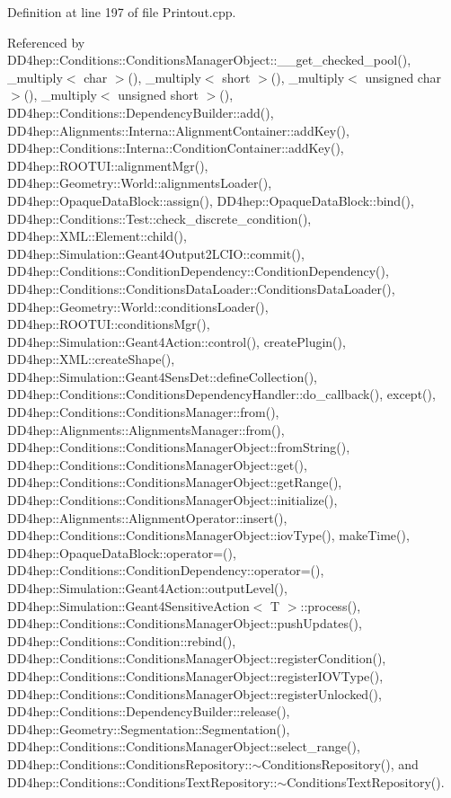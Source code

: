 Definition at line 197 of file Printout.\+cpp.



Referenced by D\+D4hep\+::\+Conditions\+::\+Conditions\+Manager\+Object\+::\+\_\+\+\_\+get\+\_\+checked\+\_\+pool(), \+\_\+multiply$<$ char $>$(), \+\_\+multiply$<$ short $>$(), \+\_\+multiply$<$ unsigned char $>$(), \+\_\+multiply$<$ unsigned short $>$(), D\+D4hep\+::\+Conditions\+::\+Dependency\+Builder\+::add(), D\+D4hep\+::\+Alignments\+::\+Interna\+::\+Alignment\+Container\+::add\+Key(), D\+D4hep\+::\+Conditions\+::\+Interna\+::\+Condition\+Container\+::add\+Key(), D\+D4hep\+::\+R\+O\+O\+T\+U\+I\+::alignment\+Mgr(), D\+D4hep\+::\+Geometry\+::\+World\+::alignments\+Loader(), D\+D4hep\+::\+Opaque\+Data\+Block\+::assign(), D\+D4hep\+::\+Opaque\+Data\+Block\+::bind(), D\+D4hep\+::\+Conditions\+::\+Test\+::check\+\_\+discrete\+\_\+condition(), D\+D4hep\+::\+X\+M\+L\+::\+Element\+::child(), D\+D4hep\+::\+Simulation\+::\+Geant4\+Output2\+L\+C\+I\+O\+::commit(), D\+D4hep\+::\+Conditions\+::\+Condition\+Dependency\+::\+Condition\+Dependency(), D\+D4hep\+::\+Conditions\+::\+Conditions\+Data\+Loader\+::\+Conditions\+Data\+Loader(), D\+D4hep\+::\+Geometry\+::\+World\+::conditions\+Loader(), D\+D4hep\+::\+R\+O\+O\+T\+U\+I\+::conditions\+Mgr(), D\+D4hep\+::\+Simulation\+::\+Geant4\+Action\+::control(), create\+Plugin(), D\+D4hep\+::\+X\+M\+L\+::create\+Shape(), D\+D4hep\+::\+Simulation\+::\+Geant4\+Sens\+Det\+::define\+Collection(), D\+D4hep\+::\+Conditions\+::\+Conditions\+Dependency\+Handler\+::do\+\_\+callback(), except(), D\+D4hep\+::\+Conditions\+::\+Conditions\+Manager\+::from(), D\+D4hep\+::\+Alignments\+::\+Alignments\+Manager\+::from(), D\+D4hep\+::\+Conditions\+::\+Conditions\+Manager\+Object\+::from\+String(), D\+D4hep\+::\+Conditions\+::\+Conditions\+Manager\+Object\+::get(), D\+D4hep\+::\+Conditions\+::\+Conditions\+Manager\+Object\+::get\+Range(), D\+D4hep\+::\+Conditions\+::\+Conditions\+Manager\+Object\+::initialize(), D\+D4hep\+::\+Alignments\+::\+Alignment\+Operator\+::insert(), D\+D4hep\+::\+Conditions\+::\+Conditions\+Manager\+Object\+::iov\+Type(), make\+Time(), D\+D4hep\+::\+Opaque\+Data\+Block\+::operator=(), D\+D4hep\+::\+Conditions\+::\+Condition\+Dependency\+::operator=(), D\+D4hep\+::\+Simulation\+::\+Geant4\+Action\+::output\+Level(), D\+D4hep\+::\+Simulation\+::\+Geant4\+Sensitive\+Action$<$ T $>$\+::process(), D\+D4hep\+::\+Conditions\+::\+Conditions\+Manager\+Object\+::push\+Updates(), D\+D4hep\+::\+Conditions\+::\+Condition\+::rebind(), D\+D4hep\+::\+Conditions\+::\+Conditions\+Manager\+Object\+::register\+Condition(), D\+D4hep\+::\+Conditions\+::\+Conditions\+Manager\+Object\+::register\+I\+O\+V\+Type(), D\+D4hep\+::\+Conditions\+::\+Conditions\+Manager\+Object\+::register\+Unlocked(), D\+D4hep\+::\+Conditions\+::\+Dependency\+Builder\+::release(), D\+D4hep\+::\+Geometry\+::\+Segmentation\+::\+Segmentation(), D\+D4hep\+::\+Conditions\+::\+Conditions\+Manager\+Object\+::select\+\_\+range(), D\+D4hep\+::\+Conditions\+::\+Conditions\+Repository\+::$\sim$\+Conditions\+Repository(), and D\+D4hep\+::\+Conditions\+::\+Conditions\+Text\+Repository\+::$\sim$\+Conditions\+Text\+Repository().

